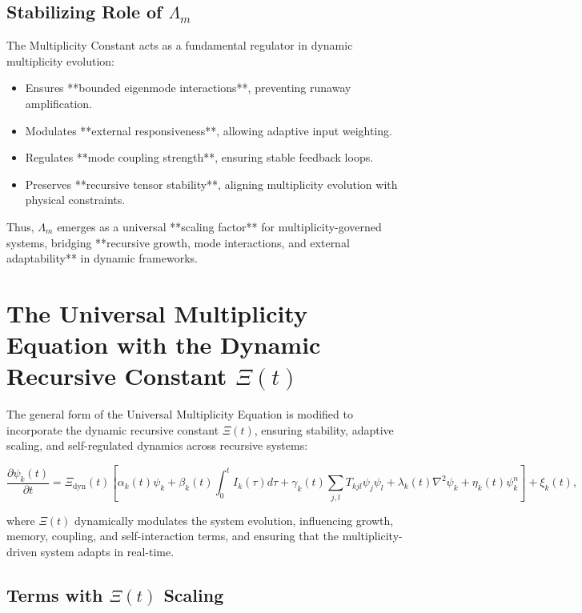 \documentclass{article}
\theoremstyle{plain}
\begin{document}
\begin{itemize}
\subsection{Stabilizing Role of \( \Lambda_m \)}

The Multiplicity Constant acts as a fundamental regulator in dynamic multiplicity evolution:

\begin{itemize}
    \item Ensures **bounded eigenmode interactions**, preventing runaway amplification.
    \item Modulates **external responsiveness**, allowing adaptive input weighting.
    \item Regulates **mode coupling strength**, ensuring stable feedback loops.
    \item Preserves **recursive tensor stability**, aligning multiplicity evolution with physical constraints.
\end{itemize}

Thus, \( \Lambda_m \) emerges as a universal **scaling factor** for multiplicity-governed systems, bridging **recursive growth, mode interactions, and external adaptability** in dynamic frameworks.


\section{The Universal Multiplicity Equation with the Dynamic Recursive Constant \(\Xi(t) \)}

The general form of the Universal Multiplicity Equation is modified to incorporate the dynamic recursive constant \(\Xi(t) \), ensuring stability, adaptive scaling, and self-regulated dynamics across recursive systems:

\begin{equation}
\frac{\partial \psi_k(t)}{\partial t} = \Xi_{\text{dyn}}(t) \left[ \alpha_k(t) \psi_k + \beta_k(t) \int_0^t I_k(\tau) d\tau + \gamma_k(t) \sum_{j,l} T_{kjl} \psi_j \psi_l + \lambda_k(t) \nabla^2 \psi_k + \eta_k(t) \psi_k^n \right] + \xi_k(t),
\end{equation}

where \(\Xi(t) \) dynamically modulates the system evolution, influencing growth, memory, coupling, and self-interaction terms, and ensuring that the multiplicity-driven system adapts in real-time.

\subsection{Terms with \(\Xi(t) \) Scaling}


\end{itemize}
\end{document}
